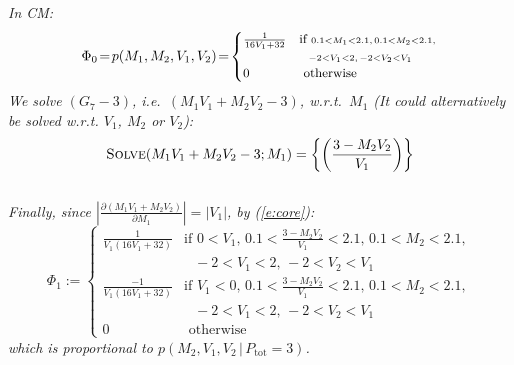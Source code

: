 \documentclass[]{article}
\newcommand{\otherwise}[1]{#1 &\text{ otherwise}}
\newcommand{\pr}{p}
\begin{document}
\emph{In CM:
\begin{equation*} \footnotesize  
\Phi_0 \!=\! \pr(M_1, M_2, V_1, V_2)  
\!=\!
\begin{cases}
\frac{1}{16 V_1 + 32} &{\text{if }\scriptstyle 0.1<M_1<2.1, \, 0.1<M_2<2.1,}\\
							 &{\;\;\, \scriptstyle -2<V_1<2, \, -2<V_2 < V_1}\\
 \otherwise{0}
 \end{cases}
\end{equation*}  
We solve  
{\footnotesize$(G_7 - 3)$}, i.e.\ 
{\footnotesize$(M_1 V_1 + M_2 V_2 - 3)$}, w.r.t.\ 
{\footnotesize $M_1$}  
(It could alternatively be solved w.r.t. 
{\footnotesize$V_1$}, 
{\footnotesize$M_2$} or 
{\footnotesize$V_2$}):\\\vspace{-1mm}
{\footnotesize 
\begin{equation}
\label{e:example.solve}
\textsc{Solve}(M_1 V_1 + M_2 V_2 - 3; M_1) = \left\{\left(\frac{3 - M_2 V_2}{V_1}\right)\right\}
\end{equation}
}\\\vspace{-1mm}
Finally, since  
{\footnotesize$\left| \frac{\partial (M_1 V_1 + M_2 V_2)}{\partial M_1} \right| = |V_1|$}, by (\ref{e:core}):
{\footnotesize
\begin{equation}  
\label{e:col-prior2}
\Phi_1 :=
\begin{cases}
\frac{1}{V_1(16 V_1 + 32)} &{\text{if }\scriptstyle 0<V_1, \, 0.1<\frac{3-M_2 V_2}{V_1}<2.1, \, 0.1<M_2<2.1,}\\
							 &{\;\;\, \scriptstyle -2<V_1<2, \, -2<V_2 < V_1}\\
\frac{-1}{V_1(16 V_1 + 32)} &{\text{if }\scriptstyle V_1<0, \, 0.1<\frac{3-M_2 V_2}{V_1}<2.1, \, 0.1<M_2<2.1,}\\
							 &{\;\;\, \scriptstyle -2<V_1<2, \, -2<V_2 < V_1}\\
 \otherwise{0}
 \end{cases}
\end{equation}
}
which is proportional to $\pr(M_2, V_1, V_2 \,|\, P_\text{tot} = 3)$.
} %
\end{document}
